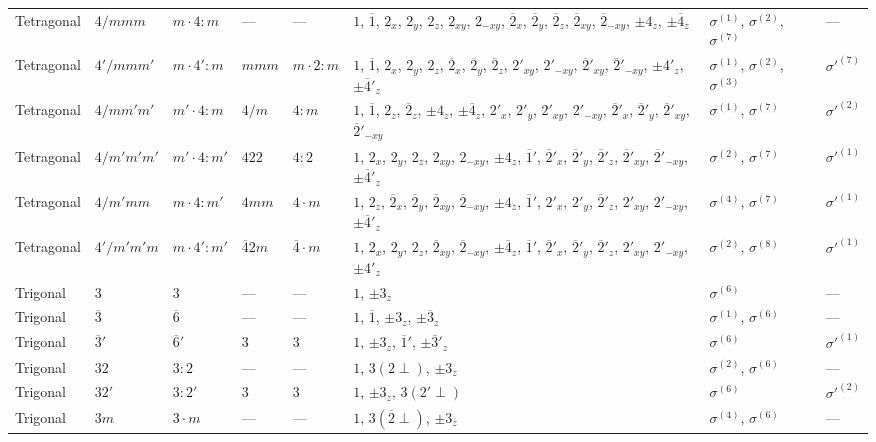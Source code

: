 \documentclass[a4paper,11pt]{article}
\newcommand{\ob}[1]{\overline{#1}}
\newcommand{\sg}[1]{\sigma^{(#1)}}
\newcommand{\sgp}[1]{\sigma'^{(#1)}}
\begin{document}
\begin{landscape}
\begin{longtable}{l l l l l p{9.5cm} l l}
Tetragonal & $4/mmm$ & $m{\cdot}4{:}m$ & --- & --- & $1$, $\ob{1}$, $2_x$, $2_y$, $2_z$, $2_{xy}$, $2_{-xy}$, $\ob{2}_x$, $\ob{2}_y$, $\ob{2}_z$, $\ob{2}_{xy}$, $\ob{2}_{-xy}$, $\pm 4_z$, $\pm\ob{4}_z$ & $\sg{1}$, $\sg{2}$, $\sg{7}$ & --- \\
Tetragonal & $4'/mmm'$ & $m{\cdot}4'{:}m$ & $mmm$ & $m{\cdot}2{:}m$ & $1$, $\ob{1}$, $2_x$, $2_y$, $2_z$, $\ob{2}_x$, $\ob{2}_y$, $\ob{2}_z$, $2'_{xy}$, $2'_{-xy}$, $\ob{2}'_{xy}$, $\ob{2}'_{-xy}$, $\pm 4'_z$, $\pm\ob{4}'_z$ & $\sg{1}$, $\sg{2}$, $\sg{3}$ & $\sgp{7}$ \\
Tetragonal & $4/mm'm'$ & $m'{\cdot}4{:}m$ & $4/m$ & $4{:}m$ & $1$, $\ob{1}$, $2_z$, $\ob{2}_z$, $\pm 4_z$, $\pm\ob{4}_z$, $2'_x$, $2'_y$, $2'_{xy}$, $2'_{-xy}$, $\ob{2}'_x$, $\ob{2}'_y$, $\ob{2}'_{xy}$, $\ob{2}'_{-xy}$ & $\sg{1}$, $\sg{7}$ & $\sgp{2}$ \\
Tetragonal & $4/m'm'm'$ & $m'{\cdot}4{:}m'$ & $422$ & $4{:}2$ & $1$, $2_x$, $2_y$, $2_z$, $2_{xy}$, $2_{-xy}$, $\pm 4_z$, $\ob{1}'$, $\ob{2}'_x$, $\ob{2}'_y$, $\ob{2}'_z$, $\ob{2}'_{xy}$, $\ob{2}'_{-xy}$, $\pm\ob{4}'_z$ & $\sg{2}$, $\sg{7}$ & $\sgp{1}$ \\
Tetragonal & $4/m'mm$ & $m{\cdot}4{:}m'$ & $4mm$ & $4{\cdot}m$ & $1$, $2_z$, $\ob{2}_x$, $\ob{2}_y$, $\ob{2}_{xy}$, $\ob{2}_{-xy}$, $\pm 4_z$, $\ob{1}'$, $2'_x$, $2'_y$, $\ob{2}'_z$, $2'_{xy}$, $2'_{-xy}$, $\pm\ob{4}'_z$ & $\sg{4}$, $\sg{7}$ & $\sgp{1}$ \\
Tetragonal & $4'/m'm'm$ & $m{\cdot}4'{:}m'$ & $\ob{4}2m$ & $\ob{4}{\cdot}m$ & $1$, $2_x$, $2_y$, $2_z$, $\ob{2}_{xy}$, $\ob{2}_{-xy}$, $\pm\ob{4}_z$, $\ob{1}'$, $\ob{2}'_x$, $\ob{2}'_y$, $\ob{2}'_z$, $2'_{xy}$, $2'_{-xy}$, $\pm 4'_z$ & $\sg{2}$, $\sg{8}$ & $\sgp{1}$ \\
\addlinespace
Trigonal & $3$ & $3$ & --- & --- & $1$, $\pm 3_z$ & $\sg{6}$ & --- \\
Trigonal & $\ob{3}$ & $\ob{6}$ & --- & --- & $1$, $\ob{1}$, $\pm 3_z$, $\pm\ob{3}_z$ & $\sg{1}$, $\sg{6}$ & --- \\
Trigonal & $\ob{3}'$ & $\ob{6}'$ & $3$ & $3$ & $1$, $\pm 3_z$, $\ob{1}'$, $\pm\ob{3}'_z$ & $\sg{6}$ & $\sgp{1}$ \\
Trigonal & $32$ & $3{:}2$ & --- & --- & $1$, $3(2{\perp})$, $\pm 3_z$ & $\sg{2}$, $\sg{6}$ & --- \\
Trigonal & $32'$ & $3{:}2'$ & $3$ & $3$ & $1$, $\pm 3_z$, $3(2'{\perp})$ & $\sg{6}$ & $\sgp{2}$ \\
Trigonal & $3m$ & $3{\cdot}m$ & --- & --- & $1$, $3(\ob{2}{\perp})$, $\pm 3_z$ & $\sg{4}$, $\sg{6}$ & --- \\

\end{longtable}
\end{landscape}
\end{document}
